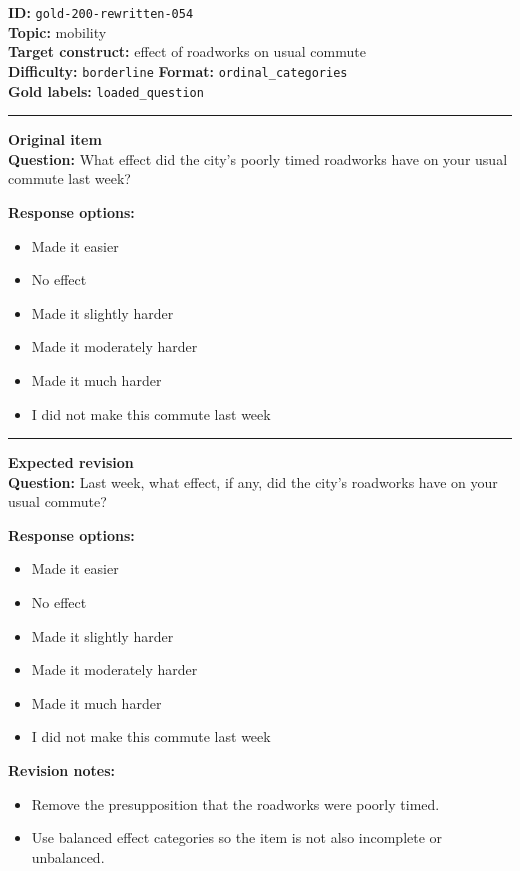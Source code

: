 \documentclass[10pt,a4paper]{article}
\newcommand{\sectionline}{\vspace{0.15em}\hrule\vspace{0.35em}}
\begin{document}
\begin{tcolorbox}[colframe=FlawRed,colback=white,colbacktitle=FlawRed!9,coltitle=black,title={Item 054\hfill Flawed item}]
\textbf{ID:} \texttt{gold-200-rewritten-054}\\
\textbf{Topic:} mobility\\
\textbf{Target construct:} effect of roadworks on usual commute\\
\textbf{Difficulty:} \texttt{borderline} \quad \textbf{Format:} \texttt{ordinal\_categories}\\
\textbf{Gold labels:} \texttt{loaded\_question}\\
\sectionline
\textbf{Original item}\\
\textbf{Question:} What effect did the city's poorly timed roadworks have on your usual commute last week?
\par\textbf{Response options:}
\begin{itemize}
\item Made it easier
\item No effect
\item Made it slightly harder
\item Made it moderately harder
\item Made it much harder
\item I did not make this commute last week
\end{itemize}
\sectionline
\textbf{Expected revision}\\
\textbf{Question:} Last week, what effect, if any, did the city's roadworks have on your usual commute?
\par\textbf{Response options:}
\begin{itemize}
\item Made it easier
\item No effect
\item Made it slightly harder
\item Made it moderately harder
\item Made it much harder
\item I did not make this commute last week
\end{itemize}
\par\textbf{Revision notes:}
\begin{itemize}
\item Remove the presupposition that the roadworks were poorly timed.
\item Use balanced effect categories so the item is not also incomplete or unbalanced.
\end{itemize}
\end{tcolorbox}
\end{document}
